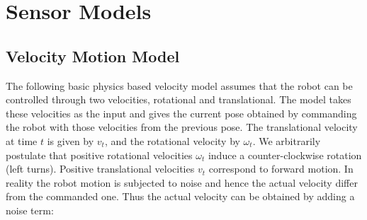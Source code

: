 \chapter{Sensor Models}
\label{appendix:one}

\section{Velocity Motion Model}

The following basic physics based velocity model assumes that the robot can be controlled through two velocities, rotational and translational. The model takes these velocities as the input and gives the current pose obtained by commanding the robot with those velocities from the  previous pose. The translational velocity at time $t$ is given by $v_t$, and the rotational velocity by $\omega_t$. We arbitrarily postulate that positive rotational velocities $\omega_t$ induce a counter-clockwise rotation (left turns). Positive translational velocities $v_t$ correspond to forward motion. In reality the robot motion is subjected to noise and hence the actual velocity differ from the commanded one. Thus the actual velocity can be obtained by adding a noise term:

